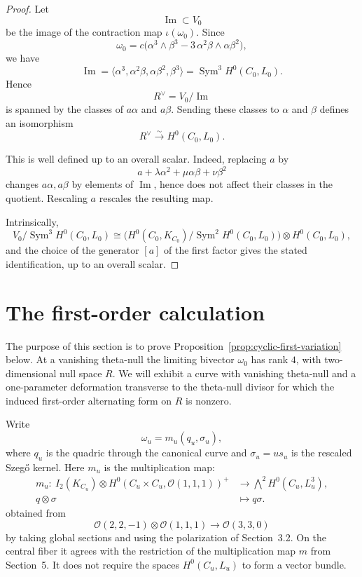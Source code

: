 \documentclass[10pt,a4paper]{amsart}
\newcommand{\OO}{\mathcal O}
\newcommand{\Sym}{\operatorname{Sym}}
\begin{document}
\begin{proof}
Let
\[
\operatorname{Im}\subset V_0
\]
be the image of the contraction map \(\iota(\omega_0)\). Since
\[
{\omega_0=c\bigl(\alpha^3\wedge\beta^3-3\,\alpha^2\beta\wedge\alpha\beta^2\bigr),}
\]
we have
\[
\operatorname{Im}
=
\langle \alpha^3,\alpha^2\beta,\alpha\beta^2,\beta^3\rangle
=
\Sym^3 H^0(C_0,L_0).
\]
Hence
\[
R^\vee = V_0/\operatorname{Im}
\]
is spanned by the classes of \(a\alpha\) and \(a\beta\). Sending these classes to \(\alpha\) and \(\beta\) defines an isomorphism
\[
R^\vee \xrightarrow{\sim} H^0(C_0,L_0).
\]

This is well defined up to an overall scalar. Indeed, replacing \(a\) by
\[
a+\lambda \alpha^2+\mu \alpha\beta+\nu \beta^2
\]
changes \(a\alpha,a\beta\) by elements of \(\operatorname{Im}\), hence does not affect their classes in the quotient. Rescaling \(a\) rescales the resulting map.

Intrinsically,
\[
V_0/\operatorname{Sym}^3H^0(C_0,L_0)
\cong
\bigl(H^0(C_0,K_{C_0})/\operatorname{Sym}^2H^0(C_0,L_0)\bigr)
\otimes H^0(C_0,L_0),
\]
and the choice of the generator \([a]\) of the first factor gives the
stated identification, up to an overall scalar.

\end{proof}

\section{The first-order calculation}
\label{sec:first-order}

The purpose of this section is to prove Proposition~\ref{prop:cyclic-first-variation} below.
At a vanishing theta-null the limiting bivector $\omega_0$ has rank $4$,
with two-dimensional null space $R$.
We will exhibit a curve with vanishing theta-null
and a one-parameter deformation transverse to the theta-null divisor
for which the induced first-order alternating form on $R$ is nonzero.

Write
\begin{equation}
\label{eq:omega-family}
\omega_u=m_u(q_u,\sigma_u),
\end{equation}
where $q_u$ is the quadric through the canonical curve and
$\sigma_u=u s_u$ is the rescaled Szeg\H{o} kernel.
\begingroup
{Here $m_u$ is the multiplication map:}
\[
\begin{aligned}
m_u:\ I_2(K_{C_u})\otimes
H^0(C_u\times C_u,\OO(1,1,1))^+
&\longrightarrow \bigwedge\nolimits^2H^0(C_u,L_u^3),\\
q\otimes\sigma&\longmapsto q\sigma.
\end{aligned}
\]
{obtained from}
\[
\OO(2,2,-1)\otimes\OO(1,1,1)\to\OO(3,3,0)
\]
{by taking global sections}
and using the polarization of Section~3.2.
On the central fiber it agrees with the restriction of the multiplication
map $m$ from Section~5. It does not require the spaces $H^0(C_u,L_u)$
to form a vector bundle.
\endgroup
\end{document}
